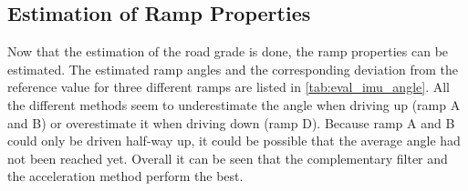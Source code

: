 \subsection{Estimation of Ramp Properties}
Now that the estimation of the road grade is done, the ramp properties can be estimated.
The estimated ramp angles and the corresponding deviation from the reference value for three different ramps are listed in \cref{tab:eval_imu_angle}.
All the different methods seem to underestimate the angle when driving up (ramp A and B) or overestimate it when driving down (ramp D).
Because ramp A and B could only be driven half-way up, it could be possible that the average angle had not been reached yet.
Overall it can be seen that the complementary filter and the acceleration method perform the best.\par
\begin{table}[htb]
    \centering
    \caption{Estimation of ramp angle.}
    \label{tab:eval_imu_angle}
\end{table}
